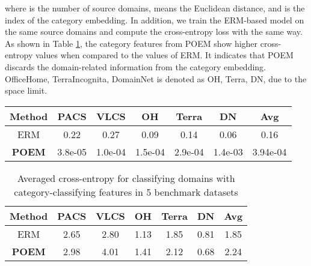 \documentclass[letterpaper]{article} \usepackage{aaai23}  \usepackage{times}  \usepackage{helvet}  \usepackage{courier}  \usepackage[hyphens]{url}  \usepackage{graphicx} \urlstyle{rm} \def\UrlFont{\rm}  \usepackage{natbib}  \usepackage{caption} \frenchspacing  \setlength{\pdfpagewidth}{8.5in}  \setlength{\pdfpageheight}{11in}  \usepackage[labelsep=period]{caption}
\begin{document}
where  is the number of source domains,  means the Euclidean distance, and  is the index of the category embedding.
In addition, we train the ERM-based model on the same source domains and compute the cross-entropy loss with the same way. 
As shown in Table \ref{tab:entropy}, the category features from POEM show higher cross-entropy values when compared to the values of ERM. 
It indicates that POEM discards the domain-related information from the category embedding. OfficeHome, TerraIncognita, DomainNet is denoted as OH, Terra, DN, due to the space limit.

\begin{table*}[!ht]
\centering
	\begin{tabular}{cccccc|c}
		\toprule
		\textbf{Method} & PACS & VLCS & OH & Terra & DN & Avg\\
		\midrule
		ERM & 0.22 & 0.27 & 0.09 & 0.14 & 0.06 & 0.16 \\
		\textbf{POEM} & 3.8e-05 & 1.0e-04 & 1.5e-04 & 2.9e-04 & 1.4e-03 & 3.94e-04 \\
		\hline
	\end{tabular}
    \caption{Averaged cosine similarity between category-classifying features and domain-classifying features}
	\label{tab:orthogonality}
\end{table*}

\begin{table}[!ht]
\centering
	\begin{tabular}{cccccc|c}
		\toprule
		\textbf{Method} & PACS & VLCS & OH & Terra & DN & Avg\\
		\midrule
		ERM & 2.65 & 2.80 & 1.13 & 1.85 & 0.81 & 1.85 \\
		\midrule
		\textbf{POEM} & 2.98 & 4.01 & 1.41 & 2.12 & 0.68 & 2.24 \\
		\hline
	\end{tabular}
    \caption{Averaged cross-entropy for classifying domains with category-classifying features in 5 benchmark datasets}
	\label{tab:entropy}
\end{table}
\end{document}
